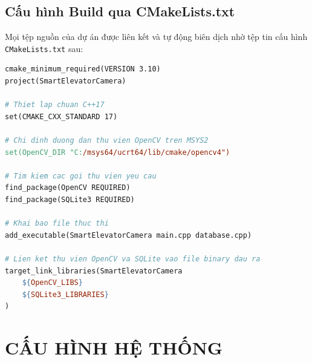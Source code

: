 \documentclass[12pt,a4paper]{article}
\begin{document}
\subsection{Cấu hình Build qua CMakeLists.txt}
Mọi tệp nguồn của dự án được liên kết và tự động biên dịch nhờ tệp tin cấu hình \texttt{CMakeLists.txt} sau:
\begin{lstlisting}[language=make]
cmake_minimum_required(VERSION 3.10)
project(SmartElevatorCamera)

# Thiet lap chuan C++17
set(CMAKE_CXX_STANDARD 17)

# Chi dinh duong dan thu vien OpenCV tren MSYS2
set(OpenCV_DIR "C:/msys64/ucrt64/lib/cmake/opencv4")

# Tim kiem cac goi thu vien yeu cau
find_package(OpenCV REQUIRED)
find_package(SQLite3 REQUIRED)

# Khai bao file thuc thi
add_executable(SmartElevatorCamera main.cpp database.cpp)

# Lien ket thu vien OpenCV va SQLite vao file binary dau ra
target_link_libraries(SmartElevatorCamera 
    ${OpenCV_LIBS} 
    ${SQLite3_LIBRARIES}
)
\end{lstlisting}

\newpage

\section{CẤU HÌNH HỆ THỐNG}
\end{document}
